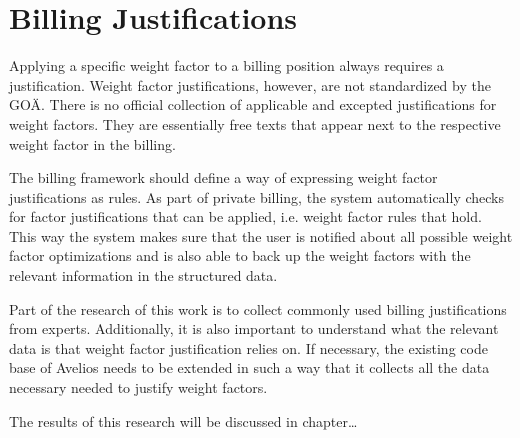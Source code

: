 \section{Billing Justifications}\label{sec:billing-justifications}

Applying a specific weight factor to a billing position always requires a justification.
Weight factor justifications, however, are not standardized by the GOÄ\cite[]{bruck1998kommentar}.
There is no official collection of applicable and excepted justifications for weight factors.
They are essentially free texts that appear next to the respective weight factor in the billing.


The billing framework should define a way of expressing weight factor justifications as rules.
As part of private billing, the system automatically checks for factor justifications that can be applied, i.e. weight factor rules that hold.
This way the system makes sure that the user is notified about all possible weight factor optimizations and is also able to back up the weight factors with the relevant information in the structured data.

Part of the research of this work is to collect commonly used billing justifications from experts.
Additionally, it is also important to understand what the relevant data is that weight factor justification relies on.
If necessary, the existing code base of Avelios needs to be extended in such a way that it collects all the data necessary needed to justify weight factors.

The results of this research will be discussed in chapter\ldots



